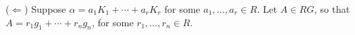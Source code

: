 \begin{enumerate}
\begin{enumerate}
               ($\Leftarrow$) Suppose $\alpha = a_1K_1 + \cdots + a_rK_r$ for
               some $a_1, \ldots, a_r \in R$. Let $A \in RG$, so that
               $A = r_1g_1 + \cdots +r_ng_n$, for some $r_1, \ldots, r_n \in R$.
      \end{enumerate}
\end{enumerate}
